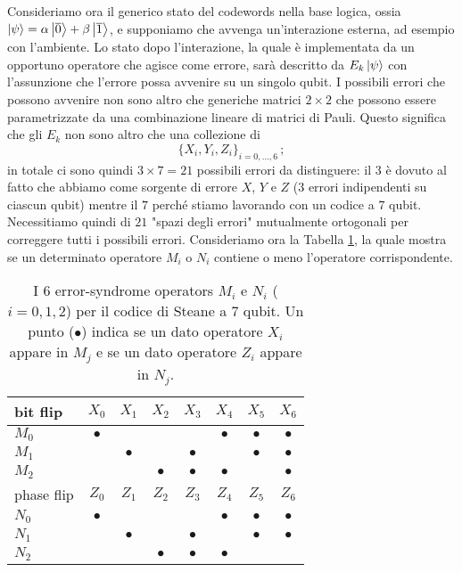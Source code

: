 \noindent Consideriamo ora il generico stato del codewords nella base logica, ossia $\ket \psi=\alpha \ket{\overline 0} + \beta \ket{\overline 1}$, e supponiamo che avvenga un'interazione esterna, ad esempio con l'ambiente. Lo stato dopo l'interazione, la quale è implementata da un opportuno operatore che agisce come errore, sarà descritto da $E_k\ket \psi$ con l'assunzione che l'errore possa avvenire su un singolo qubit. I possibili errori che possono avvenire non sono altro che generiche matrici $2 \times 2$ che possono essere parametrizzate da una combinazione lineare di matrici di Pauli. Questo significa che gli $E_k$ non sono altro che una collezione di 
\begin{equation*}
    \{X_i, Y_i, Z_i \}_{i=0,\dots,6} \, ;
\end{equation*}
in totale ci sono quindi $3 \times 7 = 21$ possibili errori da distinguere: il $3$ è dovuto al fatto che abbiamo come sorgente di errore $X$, $Y$ e $Z$ (3 errori indipendenti su ciascun qubit) mentre il $7$ perché stiamo lavorando con un codice a $7$ qubit. Necessitiamo quindi di $21$ "spazi degli errori" mutualmente ortogonali per correggere tutti i possibili errori. Consideriamo ora la Tabella \ref{tab:steane-bit-flip-cases}, la quale mostra se un determinato operatore $M_i$ o $N_i$ contiene o meno l'operatore corrispondente.  

\begin{table}[!ht]
	\centering
    \begin{tabular}{lccccccc}
        \toprule
        bit flip & $X_0$     & $X_1$     & $X_2$     & $X_3$     & $X_4$     & $X_5$     & $X_6$    \\
        \midrule
        $M_0$    & $\bullet$ &           &           &           & $\bullet$ & $\bullet$ & $\bullet$ \\
        $M_1$    &           & $\bullet$ &           & $\bullet$ &           & $\bullet$ & $\bullet$ \\
        $M_2$    &           &           & $\bullet$ & $\bullet$ & $\bullet$ &           & $\bullet$ \\
        \toprule
        phase flip & $Z_0$     & $Z_1$     & $Z_2$     & $Z_3$     & $Z_4$     & $Z_5$     & $Z_6$    \\
        \midrule
        $N_0$      & $\bullet$ &           &           &           & $\bullet$ & $\bullet$ & $\bullet$ \\
        $N_1$      &           & $\bullet$ &           & $\bullet$ &           & $\bullet$ & $\bullet$ \\
        $N_2$      &           &           & $\bullet$ & $\bullet$ & $\bullet$ &           &           \\
        \bottomrule
    \end{tabular}\\
    \caption{I 6 error-syndrome operators $M_i$ e $N_i$ ($i = 0, 1, 2$) per il codice di Steane a 7 qubit. Un punto ($\bullet$) indica se un dato operatore $X_i$ appare in $M_j$ e se un dato operatore $Z_i$ appare in $N_j$.}
    \label{tab:steane-bit-flip-cases}
\end{table}

